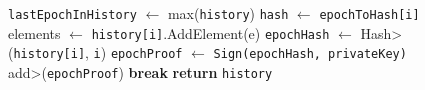 \begin{figure}[t!]
\begin{adjustbox}{minipage=[t]{\columnwidth}}
\begin{algorithm}[H]
\begin{algorithmic}[1]
            		\State \texttt{lastEpochInHistory} $\leftarrow$ max(\texttt{history})
            			\State \texttt{hash} $\leftarrow$  \texttt{epochToHash[i]}
                			\State elements $\leftarrow$ 
                					\State \texttt{history[i]}.AddElement(e)
                    	 		\EndIf
                    	 	\EndFor
                    	    \State \texttt{epochHash} $\leftarrow$ \<Hash>(\texttt{history[i]}, \texttt{i})
                			\State \texttt{epochProof} $\leftarrow$  \texttt{Sign(\texttt{epochHash}, privateKey)}
               			\State \<add>(\texttt{epochProof})
               		 \Else
               		 	\State \textbf{break}
                    	\EndIf
                	\EndFor
            		\State \textbf{return} \texttt{history}
            	\EndFunction

        \end{algorithmic}
      \end{algorithm}
	\end{adjustbox}
  \end{figure}
  
